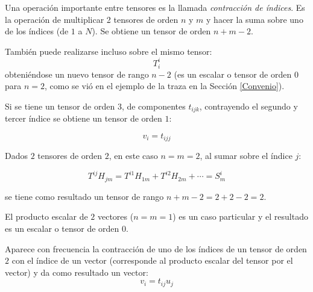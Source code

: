 Una operación importante entre tensores es la llamada \textit{contracción de índices}. Es la operación de multiplicar 2 tensores de orden $n$ y $m$ y hacer la suma sobre uno de los índices (de $1$ a $N$). Se obtiene un tensor de orden $n+m-2$.

También  puede realizarse incluso sobre el mismo tensor:
$$T^{i}_{i}$$
obteniéndose un nuevo tensor de rango $n-2$  (es un escalar o tensor de orden 0 para $n=2$, como se vió en el ejemplo de la traza  en la Sección \ref{Convenio}).


\begin{example}
Si se tiene un tensor de orden $3$, de componentes $t_{ijk}$, contrayendo el segundo y tercer índice se obtiene un tensor de orden $1$:

$$  v_i=t_{ijj} $$
\end{example}

    
\begin{example}
Dados $2$ tensores de orden $2$, en este caso $n=m=2$, al sumar sobre el índice $j$:


\begin{equation}
T^{ij}H_{jm}=T^{i1}H_{1m}+T^{i2}H_{2m}+\cdots = S^{i}_{m}
\end{equation}

\bigskip 

\noindent
se tiene  como resultado un tensor de rango $n+m-2=2+2-2=2$. 

\end{example}



\begin{remark}
    

El producto escalar de $2$ vectores ($n=m=1$) es un caso particular  y el resultado es un escalar o tensor de orden $0$. 
\end{remark}


\bigskip 
\begin{example}
Aparece con frecuencia la contracción de uno de los índices  de un tensor de orden $2$ con el índice de un vector (corresponde al producto escalar del tensor por el vector) y da como resultado un vector:
$$v_i=t_{ij}u_j$$ 
\end{example}
  



